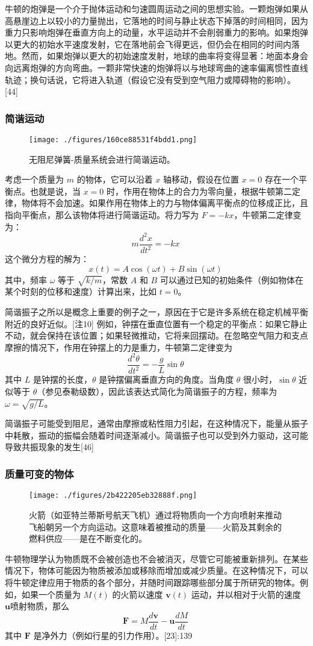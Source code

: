 牛顿的炮弹是一个介于抛体运动和匀速圆周运动之间的思想实验。一颗炮弹如果从高悬崖边上以较小的力量抛出，它落地的时间与静止状态下掉落的时间相同，因为重力只影响炮弹在垂直方向上的动量，水平运动并不会削弱重力的影响。如果炮弹以更大的初始水平速度发射，它在落地前会飞得更远，但仍会在相同的时间内落地。然而，如果炮弹以更大的初始速度发射，地球的曲率将变得显著：地面本身会向远离炮弹的方向弯曲。一颗非常快速的炮弹将以与地球弯曲的速率偏离惯性直线轨迹；换句话说，它将进入轨道（假设它没有受到空气阻力或障碍物的影响）。[44]
\subsubsection{简谐运动}
\begin{figure}[ht]
\centering
\texttt{[image: ./figures/160ce88531f4bdd1.png]}
\caption{无阻尼弹簧-质量系统会进行简谐运动。} \label{fig_NEW01_6}
\end{figure}
考虑一个质量为 \( m \) 的物体，它可以沿着 \( x \) 轴移动，假设在位置 \( x = 0 \) 存在一个平衡点。也就是说，当 \( x = 0 \) 时，作用在物体上的合力为零向量，根据牛顿第二定律，物体将不会加速。如果作用在物体上的力与物体偏离平衡点的位移成正比，且指向平衡点，那么该物体将进行简谐运动。将力写为 \( F = -kx \)，牛顿第二定律变为：
\[
m \frac{d^2 x}{dt^2} = -kx~
\]
这个微分方程的解为：
\[
x(t) = A \cos(\omega t) + B \sin(\omega t)~
\]
其中，频率 \( \omega \) 等于 \( \sqrt{k/m} \)，常数 \( A \) 和 \( B \) 可以通过已知的初始条件（例如物体在某个时刻的位移和速度）计算出来，比如 \( t = 0\)。

简谐振子之所以是概念上重要的例子之一，原因在于它是许多系统在稳定机械平衡附近的良好近似。[注10] 例如，钟摆在垂直位置有一个稳定的平衡点：如果它静止不动，就会保持在该位置；如果轻微推动，它将来回摆动。在忽略空气阻力和支点摩擦的情况下，作用在钟摆上的力是重力，牛顿第二定律变为
\[
\frac{d^2 \theta}{dt^2} = -\frac{g}{L} \sin \theta~
\]
其中 \( L \) 是钟摆的长度，\( \theta \) 是钟摆偏离垂直方向的角度。当角度 \( \theta \) 很小时，\( \sin \theta \) 近似等于 \( \theta \)（参见泰勒级数），因此该表达式简化为简谐振子的方程，频率为\(\omega = \sqrt{g/L}\)。

简谐振子可能受到阻尼，通常由摩擦或粘性阻力引起，在这种情况下，能量从振子中耗散，振动的振幅会随着时间逐渐减小。简谐振子也可以受到外力驱动，这可能导致共振现象的发生[46]
\subsubsection{质量可变的物体}
\begin{figure}[ht]
\centering
\texttt{[image: ./figures/2b422205eb32888f.png]}
\caption{火箭（如亚特兰蒂斯号航天飞机）通过将物质向一个方向喷射来推动飞船朝另一个方向运动。这意味着被推动的质量——火箭及其剩余的燃料供应——是在不断变化的。} \label{fig_NEW01_7}
\end{figure}
牛顿物理学认为物质既不会被创造也不会被消灭，尽管它可能被重新排列。在某些情况下，物体可能因为物质被添加或移除而增加或减少质量。在这种情况下，可以将牛顿定律应用于物质的各个部分，并随时间跟踪哪些部分属于所研究的物体。例如，如果一个质量为 \( M(t) \) 的火箭以速度 \( \mathbf{v}(t) \) 运动，并以相对于火箭的速度 \( \mathbf{u} \)喷射物质，那么
\[
\mathbf{F} = M\frac{d\mathbf{v}}{dt} - \mathbf{u} \frac{dM}{dt}~
\]
其中 \( \mathbf{F} \) 是净外力（例如行星的引力作用）。[23]:139
